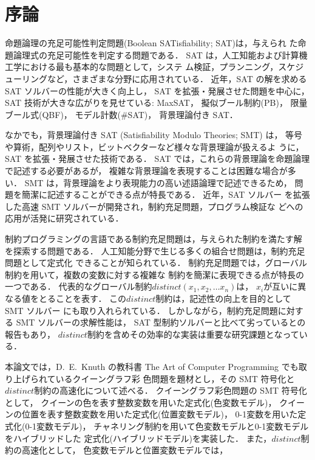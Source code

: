 \chapter{序論}
命題論理の充足可能性判定問題(Boolean SATisfiability; SAT)は，与えられ
た命題論理式の充足可能性を判定する問題である．
SAT は，人工知能および計算機工学における最も基本的な問題として，システ
ム検証，プランニング，スケジューリングなど，さまざまな分野に応用されている．
近年，SAT の解を求める SAT ソルバーの性能が大きく向上し，
SAT を拡張・発展させた問題を中心に，SAT 技術が大きな広がりを見せている:
MaxSAT，
擬似ブール制約(PB)，
限量ブール式(QBF)，
モデル計数(\#SAT)，
背景理論付き SAT．

なかでも，背景理論付き SAT (Satisfiability Modulo Theories; SMT) は，
等号や算術，配列やリスト，ビットベクターなど様々な背景理論が扱えるよ
うに，SAT を拡張・発展させた技術である．
SAT では，これらの背景理論を命題論理で記述する必要があるが，
複雑な背景理論を表現することは困難な場合が多い．
SMT は，背景理論をより表現能力の高い述語論理で記述できるため，
問題を簡潔に記述することができる点が特長である．
近年，SAT ソルバー
を拡張した高速 SMT ソルバーが開発され，制約充足問題，プログラム検証な
どへの応用が活発に研究されている．

制約プログラミングの言語である制約充足問題は，与えられた制約を満たす解
を探索する問題である．
人工知能分野で生じる多くの組合せ問題は，制約充足問題として定式化
できることが知られている．
制約充足問題では，グローバル制約を用いて，複数の変数に対する複雑な
制約を簡潔に表現できる点が特長の一つである．
代表的なグローバル制約$distinct(x_{1},x_{2},\ldots x_{n})$は，
$x_{i}$が互いに異なる値をとることを表す．
この$distinct$制約は，記述性の向上を目的として SMT ソルバー
にも取り入れられている．
しかしながら，制約充足問題に対する SMT ソルバーの求解性能は，
SAT 型制約ソルバーと比べて劣っているとの報告もあり，
$distinct$制約を含めその効率的な実装は重要な研究課題となっている．

本論文では，D.~E.~Knuth の教科書
The Art of Computer Programming\cite{Knuth:TAOCP:SAT}
でも取り上げられているクイーングラフ彩
色問題を題材とし，その SMT 符号化と$distinct$制約の高速化について述べる．
クイーングラフ彩色問題の SMT 符号化として，
クイーンの色を表す整数変数を用いた定式化(色変数モデル)，
クイーンの位置を表す整数変数を用いた定式化(位置変数モデル)，
0-1変数を用いた定式化(0-1変数モデル)，
チャネリング制約を用いて色変数モデルと0-1変数モデルをハイブリッドした
定式化(ハイブリッドモデル)を実装した．
また，$distinct$制約の高速化として，
色変数モデルと位置変数モデルでは，


